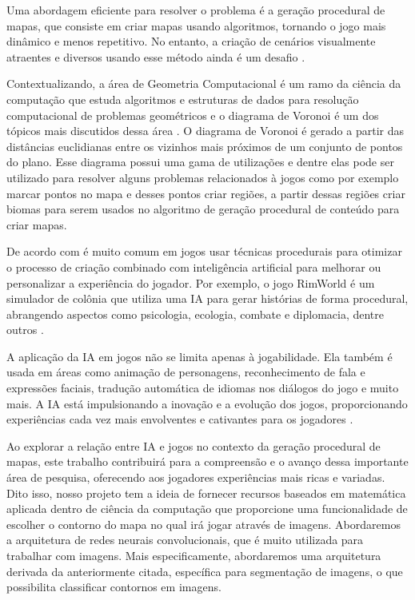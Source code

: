 Uma abordagem eficiente para resolver o problema é a geração procedural de mapas, que consiste em criar mapas usando algoritmos, tornando o jogo mais dinâmico e menos repetitivo. No entanto, a criação de cenários visualmente atraentes e diversos usando esse método ainda é um desafio \cite{geracao_procedural_jogos_2d}.

Contextualizando, a área de Geometria Computacional é um ramo da ciência da computação que estuda algoritmos e estruturas de dados para resolução computacional de problemas geométricos e o diagrama de Voronoi é um dos tópicos mais discutidos dessa 
área \cite{diagrama_voronoi_jogos}. O diagrama de Voronoi é gerado a partir das distâncias euclidianas entre os vizinhos mais próximos de um conjunto de pontos do plano\space\cite{diagrama_de_voronoi:_uma_exploracao_nas_distancias_euclidiana_e_do_taxi}. Esse diagrama possui uma gama de utilizações e dentre elas pode ser utilizado para resolver alguns problemas relacionados à jogos como por exemplo marcar pontos no mapa e desses pontos criar regiões, a partir dessas regiões criar biomas para serem usados no algoritmo de geração procedural de conteúdo para criar mapas.

De acordo com  é muito comum em jogos usar técnicas procedurais para otimizar o processo de criação combinado com inteligência artificial para melhorar ou personalizar a experiência do jogador. Por exemplo, o jogo RimWorld é um simulador de colônia que utiliza uma IA para gerar histórias de forma procedural, abrangendo aspectos como psicologia, ecologia, combate e diplomacia, dentre outros \cite{jogo_procedural}.

A aplicação da IA em jogos não se limita apenas à jogabilidade. Ela também é usada em áreas como animação de personagens, reconhecimento de fala e expressões faciais, tradução automática de idiomas nos diálogos do jogo e muito mais. A IA está impulsionando a inovação e a evolução dos jogos, proporcionando experiências cada vez mais envolventes e cativantes para os jogadores \cite{exameNvidia, omniverseace}.

Ao explorar a relação entre IA e jogos no contexto da geração procedural de mapas, este trabalho contribuirá para a compreensão e o avanço dessa importante área de pesquisa, oferecendo aos jogadores experiências mais ricas e variadas. Dito isso, nosso projeto tem a ideia de fornecer recursos baseados em matemática aplicada dentro de ciência da computação que proporcione uma funcionalidade  de escolher o contorno do mapa no qual irá jogar através de imagens. Abordaremos a arquitetura de redes neurais convolucionais, que é muito utilizada para trabalhar com imagens. Mais especificamente, abordaremos uma arquitetura derivada da anteriormente citada, específica para segmentação de imagens, o que possibilita classificar contornos em imagens.

